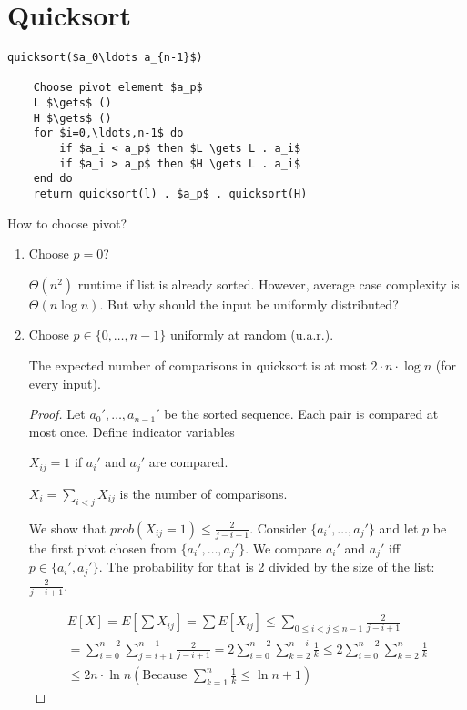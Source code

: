 \newpage

\section{Quicksort}

\begin{algorithm}
\begin{lstlisting}[mathescape]
quicksort($a_0\ldots a_{n-1}$)

    Choose pivot element $a_p$
    L $\gets$ ()
    H $\gets$ ()
    for $i=0,\ldots,n-1$ do
        if $a_i < a_p$ then $L \gets L . a_i$
        if $a_i > a_p$ then $H \gets L . a_i$
    end do
    return quicksort(l) . $a_p$ . quicksort(H)
\end{lstlisting}

\end{algorithm}

How to choose pivot?

\begin{enumerate}
\item Choose $p=0$?

$\Theta(n^2)$ runtime if list is already sorted. However, average case complexity is $\Theta(n \log n)$. But why should the input be uniformly distributed?

\item Choose $p \in \{0, \ldots, n-1\}$ uniformly at random (u.a.r.).

\begin{mytheorem}
The expected number of comparisons in quicksort is at most $2\cdot n \cdot \log n$ (for every input).
\end{mytheorem}
\begin{proof}
Let $a_0',\ldots,a_{n-1}'$ be the sorted sequence. Each pair is compared at most once. Define indicator variables

$X_{ij} = 1$ if $a_i'$ and $a_j'$ are compared.

$X_i = \sum_{i < j} X_{ij}$ is the number of comparisons.

We show that ${prob}(X_{ij} = 1) \le \frac{2}{j - i + 1}$. Consider $\{a_i', \ldots, a_j'\}$ and let $p$ be the first pivot chosen from $\{a_i', \ldots, a_j'\}$. We compare $a_i'$ and $a_j'$ iff $p \in \{a_i', a_j'\}$. The probability for that is 2 divided by the size of the list: $\frac{2}{j - i + 1}$.

\begin{align*}
E[X] = E[\sum X_{ij}] = \sum E[X_{ij}] \le \sum_{0 \le i < j \le n-1} \frac{2}{j - i + 1} \\
= \sum_{i = 0}^{n-2} \sum_{j= i+1}^{n-1} \frac{2}{j -i + 1} = 2 \sum_{i = 0}^{n-2} \sum_{k=2}^{n-i} \frac{1}{k} \le 2 \sum_{i = 0}^{n-2} \sum_{k=2}^{n} \frac{1}{k} \\
\le 2 n \cdot \ln n (\mbox{Because } \sum_{k=1}^n \frac{1}{k} \le \ln n + 1)
\end{align*}

\end{proof}

\end{enumerate}

